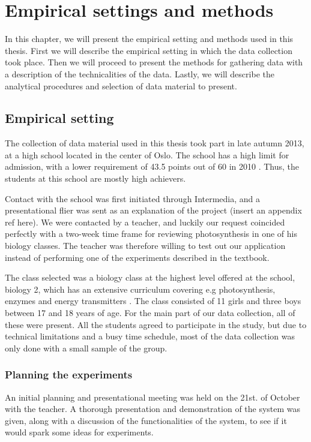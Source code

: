\chapter{Empirical settings and methods}
In this chapter, we will present the empirical setting and methods used in this thesis. First we will describe the empirical setting in which the data collection took place. Then we will proceed to present the methods for gathering data with a description of the technicalities of the data. Lastly, we will describe the analytical procedures and selection of data material to present.

\section{Empirical setting}
The collection of data material used in this thesis took part in late autumn 2013, at a high school located in the center of Oslo. The school has a high limit for admission, with a lower requirement of 43.5 points out of 60 in 2010 \citep{utdanningsetaten}. Thus, the students at this school are mostly high achievers. 

Contact with the school was first initiated through Intermedia, and a presentational flier was sent as an explanation of the project (insert an appendix ref here). We were contacted by a teacher, and luckily our request coincided perfectly with a two-week time frame for reviewing photosynthesis in one of his biology classes. The teacher was therefore willing to test out our application instead of performing one of the experiments described in the textbook. 

The class selected was a biology class at the highest level offered at the school, biology 2, which has an extensive curriculum covering e.g photosynthesis, enzymes and energy transmitters \citep{bios}. The class consisted of 11 girls and three boys between 17 and 18 years of age. For the main part of our data collection, all of these were present. All the students agreed to participate in the study, but due to technical limitations and a busy time schedule, most of the data collection was only done with a small sample of the group. 

\subsection{Planning the experiments}
An initial planning and presentational meeting was held on the 21st. of October with the teacher. A thorough presentation and demonstration of the system was given, along with a discussion of the functionalities of the system, to see if it would spark some ideas for experiments. 

